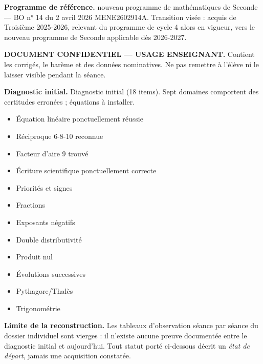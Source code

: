 \documentclass[10pt,a4paper]{article}
\begin{document}
\begin{methodbox}\small\textbf{Programme de référence.} nouveau programme de mathématiques de Seconde --- BO n° 14 du 2 avril 2026 MENE2602914A. Transition visée : acquis de Troisième 2025-2026, relevant du programme de cycle 4 alors en vigueur, vers le nouveau programme de Seconde applicable dès 2026-2027.\end{methodbox}
\begin{keybox}\textbf{DOCUMENT CONFIDENTIEL --- USAGE ENSEIGNANT.} Contient les corrigés, le barème et des données nominatives. Ne pas remettre à l'élève ni le laisser visible pendant la séance.\end{keybox}
\begin{methodbox}
\textbf{Diagnostic initial.} Diagnostic initial (18 items). Sept domaines comportent des certitudes erronées ; équations à installer.
\end{methodbox}
\begin{itemize}\item Équation linéaire ponctuellement réussie\item Réciproque 6-8-10 reconnue\item Facteur d'aire 9 trouvé\item Écriture scientifique ponctuellement correcte\end{itemize}
\begin{itemize}\item Priorités et signes\item Fractions\item Exposants négatifs\item Double distributivité\item Produit nul\item Évolutions successives\item Pythagore/Thalès\item Trigonométrie\end{itemize}
\begin{warningbox}\textbf{Limite de la reconstruction.} Les tableaux d'observation séance par séance du dossier individuel sont vierges : il n'existe aucune preuve documentée entre le diagnostic initial et aujourd'hui. Tout statut porté ci-dessous décrit un \emph{état de départ}, jamais une acquisition constatée.\end{warningbox}
\end{document}

